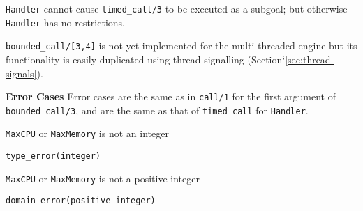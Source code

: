 \begin{description}
{\tt Handler} cannot cause {\tt timed\_call/3} to be executed as a
subgoal; but otherwise {\tt Handler} has no restrictions.

{\tt bounded\_call/[3,4]} is not yet implemented for the
multi-threaded engine but its functionality is easily duplicated using
thread signalling (Section`\ref{sec:thread-signals}).

{\bf Error Cases} 
%
Error cases are the same as in {\tt call/1} for the first argument of
{\tt bounded\_call/3}, and are the same as that of {\tt timed\_call}
for {\tt Handler}.  
%
\begin{description}
\item {\tt MaxCPU} or {\tt MaxMemory} is not an integer
\bi
\item {\tt type\_error(integer)}
\ei
\item {\tt MaxCPU} or {\tt MaxMemory}  is not a positive integer
\bi
\item {\tt domain\_error(positive\_integer)}
\ei
\end{description}

\end{description}



